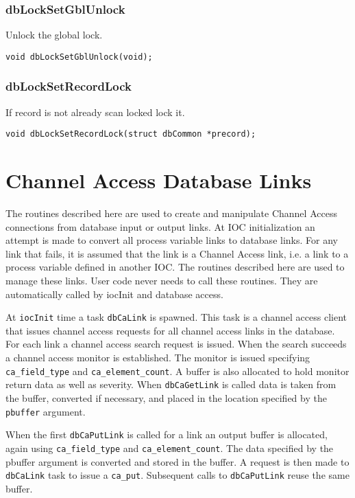 \subsubsection{dbLockSetGblUnlock}

Unlock the global lock.

\begin{verbatim}void dbLockSetGblUnlock(void);
\end{verbatim}\subsubsection{dbLockSetRecordLock}

If record is not already scan locked lock it.

\begin{verbatim}void dbLockSetRecordLock(struct dbCommon *precord);
\end{verbatim}\section{Channel Access Database Links}

The routines described here are used to create and manipulate Channel Access connections from database input or output 
links. At IOC initialization an attempt is made to convert all process variable links to database links. For any link that 
fails, it is assumed that the link is a Channel Access link, i.e. a link to a process variable defined in another IOC. The 
routines described here are used to manage these links. User code never needs to call these routines. They are 
automatically called by iocInit and database access.

At \verb|iocInit| time a task \verb|dbCaLink| is spawned. This task is a channel access client that issues channel access requests 
for all channel access links in the database. For each link a channel access search request is issued. When the search 
succeeds a channel access monitor is established. The monitor is issued specifying \verb|ca_field_type| and 
\verb|ca_element_count|. A buffer is also allocated to hold monitor return data as well as severity. When \verb|dbCaGetLink| is 
called data is taken from the buffer, converted if necessary, and placed in the location specified by the \verb|pbuffer| 
argument.

When the first \verb|dbCaPutLink| is called for a link an output buffer is allocated, again using \verb|ca_field_type| and 
\verb|ca_element_count|. The data specified by the pbuffer argument is converted and stored in the buffer. A request is then 
made to \verb|dbCaLink| task to issue a \verb|ca_put|. Subsequent calls to \verb|dbCaPutLink| reuse the same buffer.

